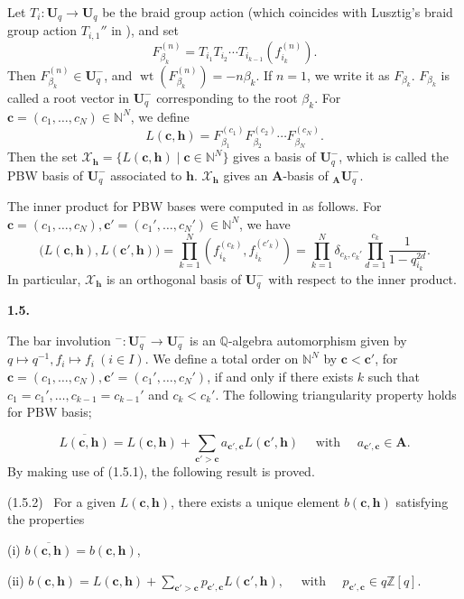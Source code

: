 \documentclass[12pt]{amsart}
\renewcommand\b{\beta}
\renewcommand\d{\delta}
\renewcommand{\1}{\mathbb 1}
\newcommand{\QQ}{\mathbb Q}
\newcommand{\ZZ}{\mathbb Z}
\newcommand{\NN}{\mathbb N}
\newcommand\BA{\mathbf A}
\newcommand\BU{\mathbf U}
\newcommand\Bh{\mathbf h}
\newcommand\Bc{\mathbf c}
\newcommand\SX{\mathscr{X}}
\newcommand\iv{^{-1}}
\newcommand\ol{\overline}
\newcommand\weit{\operatorname{wt}}
\numberwithin{equation}{section}
\def \para#1{\par\medskip\textbf{#1}
              \addtocounter{thm}{1}}
\begin{document}
Let $T_i : \BU_q \to \BU_q$ be the braid group action (which coincides with
Lusztig's braid group action $T_{i,1}''$ in \cite{L-book}), and set
\begin{equation*}
F_{\b_k}^{(n)} = T_{i_1}T_{i_2}\cdots T_{i_{k-1}}(f_{i_k}^{(n)}).
\end{equation*}
Then $F_{\b_k}^{(n)} \in \BU_q^-$, and $\weit(F_{\b_k}^{(n)}) = -n\b_k$.
If $n = 1$, we write it as $F_{\b_k}$. 
$F_{\b_k}$ is called a root vector in $\BU_q^-$ corresponding to
the root $\b_k$.  For $\Bc = (c_1, \dots, c_N) \in \NN^N$,
we define
\begin{equation*}
L(\Bc, \Bh) = F_{\b_1}^{(c_1)}F_{\b_2}^{(c_2)}\cdots F_{\b_N}^{(c_N)}.
\end{equation*}  
Then the set $\SX_{\Bh} = \{ L(\Bc, \Bh) \mid \Bc \in \NN^N\}$ gives a basis
of $\BU_q^-$, which is called the PBW basis of $\BU_q^-$ associated to $\Bh$.
$\SX_{\Bh}$ gives an $\BA$-basis of ${}_{\BA}\BU_q^-$. 
\par
The inner product for PBW bases were computed in \cite[38.2]{L-book} as follows.
For $\Bc = (c_1, \dots, c_N), \Bc' = (c_1', \dots, c_N') \in \NN^N$, we have
\begin{equation*}
\tag{1.4.1}  
\bigl(L(\Bc,\Bh), L(\Bc',\Bh)\bigr)
      = \prod_{k=1}^N(f_{i_k}^{(c_k)}, f_{i_k}^{(c'_k)})
      = \prod_{k = 1}^N \d_{c_k, c_k'}\prod_{d=1}^{c_k} \frac{1}{1- q_{i_k}^{2d}}.
\end{equation*}  
In particular, $\SX_{\Bh}$ is an orthogonal basis of $\BU_q^-$
with respect to the inner product. 

\para{1.5.}
The bar involution ${}^- : \BU_q^- \to \BU_q^-$ is an $\QQ$-algebra
automorphism given by $q \mapsto q\iv, f_i \mapsto f_i \ (i \in I)$.
We define a total order on $\NN^N$ by $\Bc < \Bc'$, for
$\Bc = (c_1, \dots, c_N), \Bc' = (c_1', \dots, c_N')$,  if and only if
there exists $k$ such that $c_1 = c_1', \dots, c_{k-1} = c_{k-1}'$ and $c_k < c_k'$. 
The following triangularity property holds for PBW basis;

\begin{equation*}
\tag{1.5.1}  
  \ol{ L(\Bc, \Bh)} = L(\Bc,\Bh) + \sum_{\Bc' > \Bc}a_{\Bc', \Bc}L(\Bc',\Bh)
       \quad\text{ with } \quad a_{\Bc',\Bc} \in \BA.
\end{equation*}  
By making use of (1.5.1), the following result is proved.
\par\medskip\noindent
(1.5.2) \ For a given $L(\Bc,\Bh)$, there exists a unique element
$b(\Bc, \Bh)$ satisfying the properties
\par\medskip
(i) $\ol{b(\Bc,\Bh)} = b(\Bc,\Bh)$, 
\par
(ii) 
 $b(\Bc, \Bh) = L(\Bc,\Bh) + \sum_{\Bc' > \Bc}p_{\Bc',\Bc}L(\Bc', \Bh),
\quad \text{ with }\quad  p_{\Bc',\Bc} \in q\ZZ[q]$.
\end{document}
